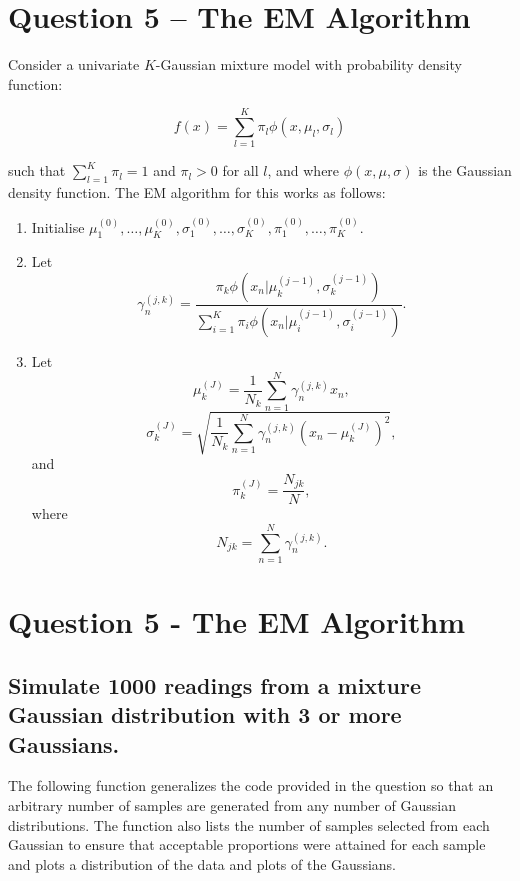 \documentclass[]{article}
\begin{document}


\section{Question 5 – The EM Algorithm }

Consider a univariate $K$-Gaussian mixture model with probability density function:

$$
f(x) = \sum_{l=1}^{K} \pi_l \phi(x, \mu_l, \sigma_l)
$$

\noindent such that $\sum_{l=1}^{K} \pi_l = 1$ and $\pi_l > 0$ for all $l$, and where $\phi(x, \mu, \sigma)$ is the Gaussian density function. The EM algorithm for this works as follows:

\begin{enumerate}
	\item Initialise $\mu_1^{(0)}, \dots, \mu_K^{(0)}, \sigma_1^{(0)}, \dots, \sigma_K^{(0)}, \pi_1^{(0)}, \dots, \pi_K^{(0)}$.
	
	\item Let 
	$$
	\gamma_n^{(j,k)} = \frac{\pi_k \phi(x_n | \mu_k^{(j-1)}, \sigma_k^{(j-1)})}{\sum_{i=1}^{K} \pi_i \phi(x_n | \mu_i^{(j-1)}, \sigma_i^{(j-1)})}.
	$$
	
	\item Let
	$$
	\mu_k^{(J)} = \frac{1}{N_k} \sum_{n=1}^{N} \gamma_n^{(j,k)} x_n, 
	$$
	$$
	\sigma_k^{(J)} = \sqrt{\frac{1}{N_k} \sum_{n=1}^{N} \gamma_n^{(j,k)} (x_n - \mu_k^{(J)})^2},
	$$
	and 
	$$
	\pi_k^{(J)} = \frac{N_{jk}}{N},
	$$
	where
	$$
	N_{jk} = \sum_{n=1}^{N} \gamma_n^{(j,k)}.
	$$
\end{enumerate}



\section{Question 5 - The EM Algorithm}

\subsection{Simulate 1000 readings from a mixture Gaussian distribution with 3 or more Gaussians.}

The following function generalizes the code provided in the question so that an arbitrary number of samples are generated from any number of Gaussian distributions. The function also lists the number of samples selected from each Gaussian to ensure that acceptable proportions were attained for each sample and plots a distribution of the data and plots of the Gaussians.
\end{document}
